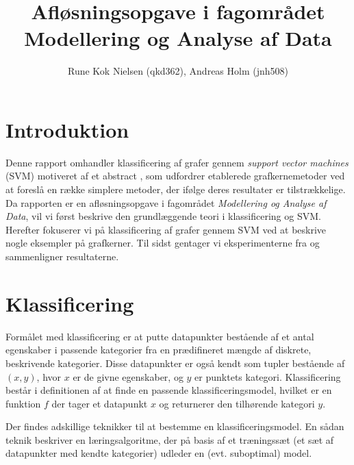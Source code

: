 \documentclass{article}
\author{Rune Kok Nielsen (qkd362), Andreas Holm (jnh508)}
\title{Afløsningsopgave i fagområdet Modellering og Analyse af Data}
\begin{document}
\maketitle

\newpage
\tableofcontents
\newpage

\section{Introduktion}
Denne rapport omhandler klassificering af grafer gennem \textit{support vector machines} (SVM) motiveret af et abstract \cite{trivial-kernels}, som udfordrer etablerede grafkernemetoder ved at foreslå en række simplere metoder, der ifølge deres resultater er tilstrækkelige. Da rapporten er en afløsningsopgave i fagområdet \textit{Modellering og Analyse af Data}, vil vi først beskrive den grundlæggende teori i klassificering og SVM. Herefter fokuserer vi på klassificering af grafer gennem SVM ved at beskrive nogle eksempler på grafkerner. Til sidst gentager vi eksperimenterne fra \cite{trivial-kernels} og sammenligner resultaterne.


\section{Klassificering}
Formålet med klassificering er at putte datapunkter bestående af et antal egenskaber i passende kategorier fra en prædifineret mængde af diskrete, beskrivende kategorier. Disse datapunkter er også kendt som tupler bestående af $(x,y)$, hvor $x$ er de givne egenskaber, og $y$ er punktets kategori. Klassificering består i definitionen af at finde en passende klassificeringsmodel, hvilket er en funktion $f$ der tager et datapunkt $x$ og returnerer den tilhørende kategori $y$.

Der findes adskillige teknikker til at bestemme en klassificeringsmodel. En sådan teknik beskriver en læringsalgoritme, der på basis af et træningssæt (et sæt af datapunkter med kendte kategorier) udleder en (evt. suboptimal) model.
\end{document}

